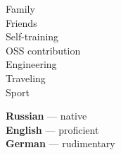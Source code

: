 \documentclass[11pt]{developercv} %
\begin{document}
\vspace{1.5cm}
\hfill
\begin{minipage}[t]{0.3\textwidth}
  \vspace{-\baselineskip} %


  Family\\
  Friends\\
  Self-training\\
  OSS contribution\\
  Engineering\\
  Traveling\\
  Sport\\
\end{minipage}
\hfill
\begin{minipage}[t]{0.3\textwidth}
  \vspace{-\baselineskip} %


  \textbf{Russian} --- native\\
  \textbf{English} --- proficient\\
  \textbf{German} --- rudimentary
\end{minipage}
\hfill

\end{document}

